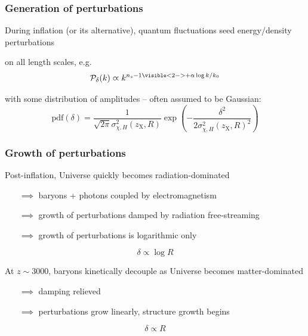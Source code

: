 \documentclass[xcolor=dvipsnames]{beamer}
\begin{document}
\begin{frame}
\frametitle{Generation of perturbations}

During inflation (or its alternative), quantum fluctuations seed energy/density perturbations
{\footnotesize
\bi
 \item on all length scales, e.g. 
 \begin{equation}
   \mathcal{P}_\delta(k) \varpropto k^{n_s - 1 \visible<2->{+\alpha\log k/k_0}}
 \end{equation}
 {
   \item with some distribution of amplitudes -- often assumed to be Gaussian:
   \begin{equation}
     \mathrm{pdf}(\delta) = \frac{1}{\sqrt{2\pi}\sigma^2_{\chi,H}(z_\mathrm{X},R)} \exp\left(-\frac{\delta^2}{2\sigma^2_{\chi,H}(z_\mathrm{X},R)^2}\right)
   \end{equation}
 }
\ei}




\end{frame}

\begin{frame}
\frametitle{Growth of perturbations}

Post-inflation, Universe quickly becomes \alert{radiation-dominated}
\begin{itemize}
  \item[\textcolor{black}{$\implies$}] baryons + photons coupled by electromagnetism\\
  \item[\textcolor{black}{$\implies$}] growth of perturbations damped by radiation free-streaming\\
  \item[\textcolor{black}{$\implies$}] growth of perturbations is \alert{logarithmic only}
\end{itemize}
\begin{equation}
\delta\varpropto\log R
\end{equation}

At $z\sim3000$, baryons kinetically decouple as Universe becomes \alert{matter-dominated}
\begin{itemize}
  \item[\textcolor{black}{$\implies$}] damping relieved\\
  \item[\textcolor{black}{$\implies$}] perturbations grow linearly, structure growth begins
\end{itemize}
\begin{equation}
\delta\varpropto R
\end{equation}

\end{frame}
\end{document}

